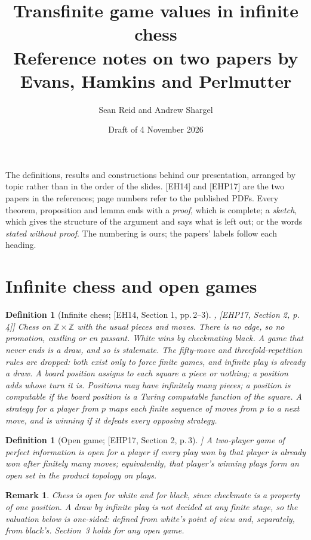 \documentclass[10pt]{article}
\title{Transfinite game values in infinite chess\\[0.3em]
  \large Reference notes on two papers by Evans, Hamkins and Perlmutter}
\author{Sean Reid and Andrew Shargel}
\date{Draft of 4 November 2026}
\theoremstyle{notes}
\newtheorem{definition}[theorem]{Definition}
\newtheorem{remark}[theorem]{Remark}
\newcommand{\EH}[1]{[EH14, #1]}
\newcommand{\EHP}[1]{[EHP17, #1]}
\begin{document}
\maketitle
\vspace{-1.8em}

The definitions, results and constructions behind our presentation, arranged by topic rather than in the
order of the slides. [EH14] and [EHP17] are the two papers in the references; page numbers refer to the
published PDFs. Every theorem, proposition and lemma ends with a \emph{proof}, which is complete; a \emph{sketch},
which gives the structure of the argument and says what is left out; or the words \emph{stated without
proof}. The numbering
is ours; the papers' labels follow each heading.

\section{Infinite chess and open games}

\begin{definition}[Infinite chess; \EH{Section 1, pp.\,2--3}, \EHP{Section 2, p.\,4}]
Chess on $\mathbb{Z}\times\mathbb{Z}$ with the usual pieces and moves. There is no edge, so no promotion,
castling or en passant. White wins by checkmating black. A game that never ends is a draw, and so is
stalemate. The fifty-move and threefold-repetition rules are dropped: both exist only to force finite games,
and infinite play is already a draw. A \emph{board position} assigns to each square a piece or nothing; a
\emph{position} adds whose turn it is. Positions may have infinitely many pieces; a position is
\emph{computable} if the board position is a Turing computable function of the square. A \emph{strategy}
for a player from $p$ maps each finite sequence of moves from $p$ to a next move, and is \emph{winning} if it
defeats every opposing strategy.
\end{definition}

\begin{definition}[Open game; \EHP{Section 2, p.\,3}]
A two-player game of perfect information is \emph{open for a player} if every play won by that player is
already won after finitely many moves; equivalently, that player's winning plays form an open set in the
product topology on plays.
\end{definition}

\begin{remark}
Chess is open for white and for black, since checkmate is a property of one position. A draw by infinite
play is not decided at any finite stage, so the valuation below is one-sided: defined from white's point of
view and, separately, from black's. Section~3 holds for any open game.
\end{remark}
\end{document}
